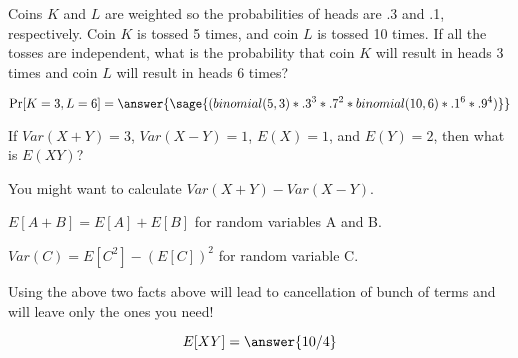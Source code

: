 \documentclass{ximera}
\begin{document}
\begin{problem}
Coins $K$ and $L$ are weighted so the probabilities of heads are .3 and .1, respectively. Coin $K$ is tossed 5 times, and coin $L$ is tossed 10 times. If all the tosses are independent, what is the probability that coin $K$ will result in heads 3 times and coin $L$ will result in heads 6 times? 

\begin{prompt}
$$\Pr[K=3, L=6]=\answer{\sage{(binomial(5,3)*.3^3*.7^2*binomial(10,6)*.1^6*.9^4)}}$$
\end{prompt}

\end{problem}

\begin{problem}
If $Var(X + Y) = 3$, $Var(X-Y)=1$, $E(X) = 1$, and $E(Y) = 2$, then what is $E(XY)$? 
\begin{hint}
\item You might want to calculate $Var(X+Y)-Var(X-Y)$. 
\item $E[A+B]=E[A]+E[B]$ for random variables A and B.
\item $Var(C)=E[C^2]-(E[C])^2$ for random variable C.
\item Using the above two facts above will lead to cancellation of bunch of terms and will leave only the ones you need!
\end{hint}

\begin{prompt}
$$
E[XY]=\answer{10/4}
$$ 
\end{prompt}

\end{problem}
\end{document}
